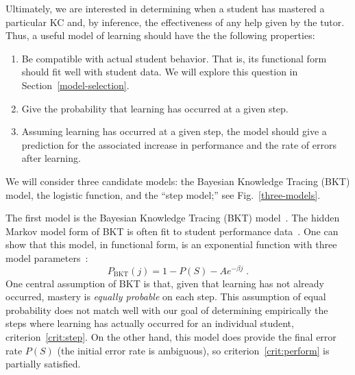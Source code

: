 \documentclass{edm_template}
\begin{document}
Ultimately, we are interested in determining when a student has mastered
a particular KC and, by inference, the effectiveness of
any help given by the tutor.  Thus, a useful model of learning
should  have the the following properties:
\label{model-criteria}
%
\begin{enumerate} 

\item Be compatible with actual student behavior.
      That is, its
      functional form should fit well with student data.
      We will explore this question in Section~\ref{model-selection}.  

\item \label{crit:step}
      Give the probability that learning has occurred at a given step.

\item  \label{crit:perform}
     Assuming learning has occurred at a given step, the model
     should give a prediction for the 
     associated increase in performance and 
     the rate of errors after learning.

\end{enumerate}
%
We will consider three candidate models:  
the Bayesian Knowledge Tracing (BKT) model, the logistic function,
and the ``step model;''
see Fig.~\ref{three-models}.



The first model is the Bayesian Knowledge Tracing (BKT) 
model~\cite{corbett_knowledge_1995}.  The hidden Markov model
form of BKT is often fit to student performance 
data~\cite{beck_identifiability:_2007}.  One can show that
this model, in functional form, is an exponential function
with three model parameters~\cite{van_de_sande_properties_2012}:
%
\begin{equation}
         P_\mathrm{BKT}(j) = 1-P(S) -A e^{-\beta j} \; .
\end{equation}
%
One central assumption of BKT is that, given that learning
has not already occurred, mastery is {\em equally probable} on each step.
This assumption of equal probability does not match well with 
our goal of determining empirically the steps where learning has 
actually occurred for an individual student, criterion~\ref{crit:step}.
On the other hand, this model does provide the final
error rate $P(S)$ (the initial error rate is ambiguous), 
so criterion~\ref{crit:perform} is partially satisfied. 
\end{document}
